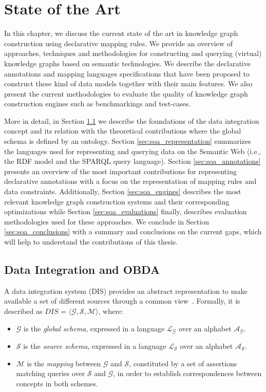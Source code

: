 \chapter{State of the Art}
\label{chap:soa}

In this chapter, we discuss the current state of the art in knowledge graph construction using declarative mapping rules. We provide an overview of approaches, techniques and methodologies for constructing and querying (virtual) knowledge graphs based on semantic technologies. We describe the declarative annotations and mapping languages specifications that have been proposed to construct these kind of data models together with their main features. We also present the current methodologies to evaluate the quality of knowledge graph construction engines such as benchmarkings and test-cases. 

More in detail, in Section \ref{sec:soa_integration} we describe the foundations of the data integration concept and its relation with the theoretical contributions where the global schema is defined by an ontology. Section \ref{sec:soa_representation} summarizes the languages used for representing and querying data on the Semantic Web (i.e., the RDF model and the SPARQL query language). Section \ref{sec:soa_annotations} presents an overview of the most important contributions for representing declarative annotations with a focus on the representation of mapping rules and data constraints. Additionally, Section \ref{sec:soa_engines} describes the most relevant knowledge graph construction systems and their corresponding optimizations while Section \ref{sec:soa_evaluations} finally, describes evaluation methodologies used for these approaches. We conclude in Section \ref{sec:soa_conclusions} with a summary and conclusions on the current gaps, which will help to understand the contributions of this thesis.


\section{Data Integration and OBDA}
\label{sec:soa_integration}
A data integration system (DIS) provides an abstract representation to make available a set of different sources through a common view~\citep{Lenzerini02}. Formally, it is described as $DIS$ = $\langle \mathcal{G}, \mathcal{S}, \mathcal{M} \rangle$, where:
\begin{itemize}
    \item $\mathcal{G}$ is the \textit{global schema}, expressed in a language $\mathcal{L_G}$ over an alphabet $\mathcal{A_G}$.
    
    \item $\mathcal{S}$ is the \textit{source schema}, expressed in a language $\mathcal{L_S}$ over an alphabet $\mathcal{A_S}$.
    
    \item $\mathcal{M}$ is the \textit{mapping} between $\mathcal{G}$ and $\mathcal{S}$, constituted by a set of assertions matching queries over $\mathcal{S}$ and $\mathcal{G}$, in order to establish correspondences between concepts in both schemes.
\end{itemize}

